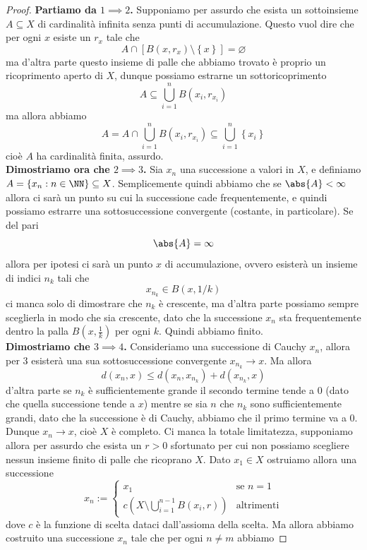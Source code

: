 \documentclass[11pt]{scrartcl}
\newcommand{\eset}{\varnothing}
\begin{document}
	\begin{proof}
		\textbf{Partiamo da $1\implies 2$.} Supponiamo per assurdo che esista un sottoinsieme $A\subseteq X$ di cardinalità infinita senza punti di accumulazione. Questo vuol dire che per ogni $x$ esiste un $r_x$ tale che
		$$A\cap \left[B(x,r_x)\setminus \left\{x\right\}\right]=\eset$$
		ma d'altra parte questo insieme di palle che abbiamo trovato è proprio un ricoprimento aperto di $X$, dunque possiamo estrarne un sottoricoprimento
		$$A\subseteq \bigcup_{i=1}^n B(x_i,r_{x_i})$$
		ma allora abbiamo
		$$A=A\cap \bigcup_{i=1}^n B(x_i,r_{x_i})\subseteq \bigcup_{i=1}^n \left\{x_i\right\}$$
		cioè $A$ ha cardinalità finita, assurdo. \\
		\textbf{Dimostriamo ora che $2\implies 3$.} Sia $x_n$ una successione a valori in $X$, e definiamo $A=\left\{x_n:n\in\NN\right\}\subseteq X$. Semplicemente quindi abbiamo che se $\abs{A}<\infty$ allora ci sarà un punto su cui la successione cade frequentemente, e quindi possiamo estrarre una sottosuccessione convergente (costante, in particolare). Se del pari
		$$\abs{A}=\infty$$
		allora per ipotesi ci sarà un punto $x$ di accumulazione, ovvero esisterà un insieme di indici $n_k$  tali che
		$$x_{n_k}\in B(x,1/k)$$
		ci manca solo di dimostrare che $n_k$ è crescente, ma d'altra parte possiamo sempre sceglierla in modo che sia crescente, dato che la successione $x_n$ sta frequentemente dentro la palla $B(x,\frac{1}{k})$ per ogni $k$. Quindi abbiamo finito. \\
		\textbf{Dimostriamo che $3\implies 4$.} Consideriamo una successione di Cauchy $x_n$, allora per $3$ esisterà una sua sottosuccessione convergente $x_{n_k}\to x$. Ma allora
		$$d(x_n,x)\le d(x_n,x_{n_k})+d(x_{n_k},x)$$
		d'altra parte se $n_k$ è sufficientemente grande il secondo termine tende a $0$ (dato che quella successione tende a $x$) mentre se sia $n$ che $n_k$ sono sufficientemente grandi, dato che la successione è di Cauchy, abbiamo che il primo termine va a $0$. Dunque $x_n\to x$, cioè $X$ è completo. Ci manca la totale limitatezza, supponiamo allora per assurdo che esista un $r>0$ sfortunato per cui non possiamo scegliere nessun insieme finito di palle che ricoprano $X$. Dato $x_1\in X$ ostruiamo allora una successione
		$$x_n:=\begin{cases}
			x_1 & \text{se $n=1$} \\
			c\left(X\setminus \bigcup_{i=1}^{n-1}B(x_i,r)\right) & \text{altrimenti}
		\end{cases}$$
		dove $c$ è la funzione di scelta dataci dall'assioma della scelta. Ma allora abbiamo costruito una successione $x_n$ tale che per ogni $n\ne m$ abbiamo 

\end{proof}
\end{document}
